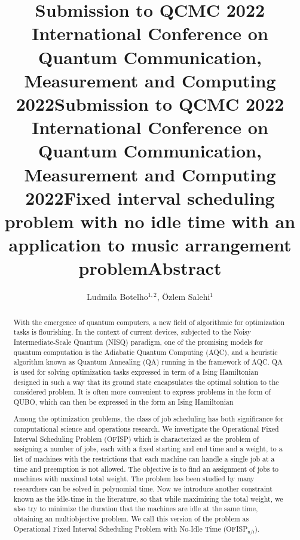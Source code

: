 \documentclass[aps,reprint]{revtex4-2}
\title@column %
\title{\normalsize Submission to QCMC 2022 \\ %
            International Conference on Quantum Communication,\\ 
            Measurement and Computing 2022}
\makeatletter
\newcommand{\printentry}{%
    \@author@finish%
    \title@column %
    \titleblock@produce %
    \suppressfloats[t] %
    \let\@AAC@list\@empty %
    \let\@AFF@list\@empty %
    \let\@AFG@list\@empty %
    \let\@address\@empty %
    \titlepage@sw %
    {\vfil\clearpage}%
}
\newcommand{\printheader}{%
    \title{\normalsize Submission to QCMC 2022 \\ %
            International Conference on Quantum Communication,\\ 
            Measurement and Computing 2022}
    \printentry
}
\makeatother
\begin{document}
\printheader



\title{Fixed interval scheduling problem with no idle time with an application to music arrangement problem} %
\author{Ludmila Botelho$^{1,2}$, \"Ozlem Salehi$^{1}$} %
{} %

\printentry
\title{\small Abstract}
\begin{abstract}
  
With the emergence of quantum computers, a new field of algorithmic for optimization tasks is flourishing. In the context of current devices, subjected to the Noisy Intermediate-Scale Quantum (NISQ) paradigm, one of the promising models for quantum computation is the Adiabatic Quantum Computing (AQC), and a heuristic algorithm known as Quantum Annealing (QA) running in the framework of AQC. QA is used for solving optimization tasks expressed in term of a Ising Hamiltonian designed in such a way that its ground state encapsulates the optimal solution to the considered problem. It is often more convenient to express problems in the form of QUBO, which can then be expressed in the form an Ising Hamiltonian

Among the optimization problems, the class of job scheduling has both significance for computational science and operations research. We investigate the Operational Fixed Interval Scheduling Problem (OFISP) which is characterized as the problem of assigning a number of jobs, each with a fixed starting and end time and a weight, to a list of machines with the restrictions that each machine can handle a single job at a time and preemption is not allowed. The objective is to find an assignment of jobs to machines with maximal total weight. The problem has been studied by many researchers can be solved in polynomial time. Now we introduce another constraint known as the idle-time in the literature, so that while maximizing the total weight, we also try to minimize the duration that the machines are idle at the same time, obtaining an multiobjective problem. We call this version of the problem as Operational Fixed Interval Scheduling Problem with No-Idle Time (OFISP$_\text{n/i}$).   


\end{abstract}
\end{document}
